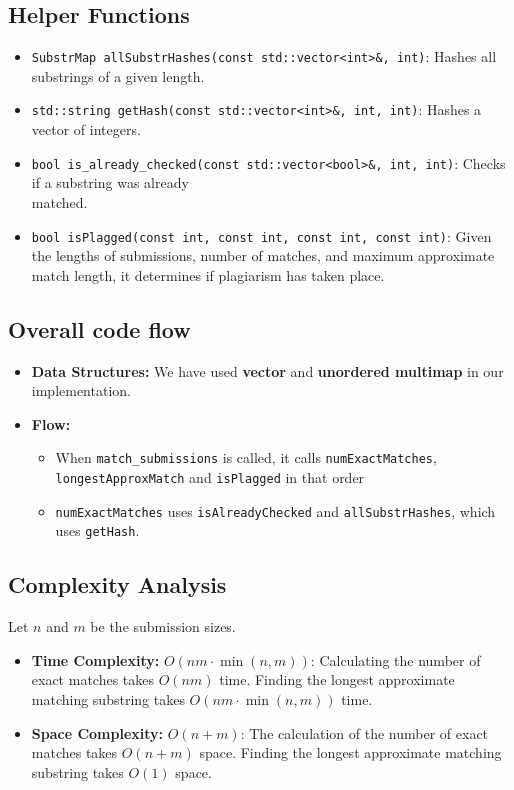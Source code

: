 \documentclass[11pt]{article}
\let\oldtexttt\texttt
\def\texttt#1{{\color{RoyalBlue}\oldtexttt{#1}}}
\begin{document}
\subsection{Helper Functions}
\begin{itemize}[noitemsep]
    \item \texttt{SubstrMap allSubstrHashes(const std::vector<int>\&, int)}: Hashes all substrings of a given length.
    \item \texttt{std::string getHash(const std::vector<int>\&, int, int)}:
    Hashes a vector of integers.
    \item \texttt{bool is\_already\_checked(const std::vector<bool>\&, int, int)}:
    Checks if a substring was already \\ matched.
    \item \texttt{bool isPlagged(const int, const int, const int, const int)}:
    Given the lengths of submissions, number of matches, and maximum approximate match length, it determines if plagiarism has taken place.
\end{itemize}

\subsection{Overall code flow}
\begin{itemize}[noitemsep]
     
    \item \textbf{Data Structures:} We have used \textbf{vector} and \textbf{unordered multimap} in our implementation.
    \item \textbf{Flow:} \begin{itemize}
        \item When \texttt{match\_submissions} is called, it calls \texttt{numExactMatches}, \texttt{longestApproxMatch} and \texttt{isPlagged} in that order
        \item \texttt{numExactMatches} uses \texttt{isAlreadyChecked} and \texttt{allSubstrHashes}, which uses \texttt{getHash}.
    \end{itemize}
\end{itemize}

\subsection{Complexity Analysis}
Let $n$ and $m$ be the submission sizes.
\begin{itemize}[noitemsep]
    \item \textbf{Time Complexity:} $O(nm\cdot\min(n, m))$: Calculating the number of exact matches takes $O(nm)$ time. Finding the longest approximate matching substring takes $O(nm\cdot\min(n, m))$ time.
    \item \textbf{Space Complexity:} $O(n + m)$: The calculation of the number of exact matches takes $O(n + m)$ space. Finding the longest approximate matching substring takes $O(1)$ space.
\end{itemize}
\end{document}
